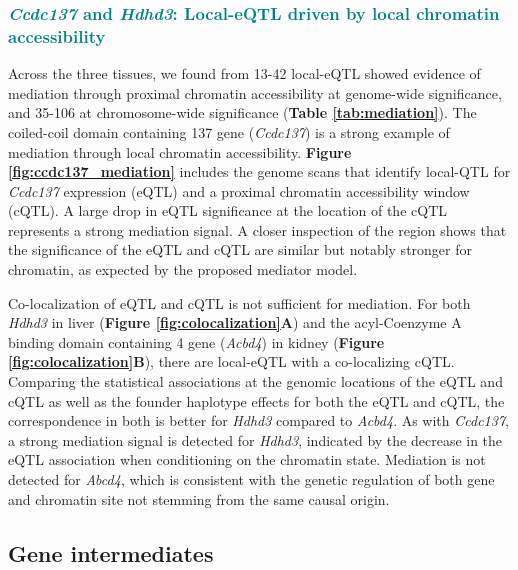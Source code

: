 \documentclass[9pt,twocolumn,twoside]{gsajnl}
\newcommand{\WVinline}[1]{\textcolor{red}{#1}}
\newcommand{\GKinline}[1]{\textcolor{teal}{#1}}
\begin{document}
\subsubsection{\GKinline{\textit{Ccdc137} and \textit{Hdhd3}: Local-eQTL driven by local chromatin accessibility}}
Across the three tissues, we found from 13-42 local-eQTL showed evidence of mediation through proximal chromatin accessibility at genome-wide significance, and 35-106 at chromosome-wide significance (\textbf{Table \ref{tab:mediation}}). The coiled-coil domain containing 137 gene (\textit{Ccdc137}) is a strong example of mediation through local chromatin accessibility. \textbf{Figure \ref{fig:ccdc137_mediation}} includes the genome scans that identify local-QTL for \textit{Ccdc137} expression (eQTL) and a proximal chromatin accessibility window (cQTL). 
A large drop in eQTL significance at the location of the cQTL represents a strong mediation signal. A closer inspection of the region shows that the significance of the eQTL and cQTL are similar but notably stronger for chromatin, as expected by the proposed mediator model. 

Co-localization of eQTL and cQTL is not sufficient for mediation. For both \textit{Hdhd3} in liver (\textbf{Figure \ref{fig:colocalization}A}) and the acyl-Coenzyme A binding domain containing 4 gene (\textit{Acbd4}) in kidney (\textbf{Figure \ref{fig:colocalization}B}), there are local-eQTL with a co-localizing cQTL. Comparing the statistical associations at the genomic locations of the eQTL and cQTL as well as the founder haplotype effects for both the eQTL and cQTL, the correspondence in both is better for \textit{Hdhd3} compared to \textit{Acbd4}. As with \textit{Ccdc137}, a strong mediation signal is detected for \textit{Hdhd3}, indicated by the decrease in the eQTL association when conditioning on the chromatin state. Mediation is not detected for \textit{Abcd4}, which is consistent with the genetic regulation of both gene and chromatin site not stemming from the same causal origin.

\subsection{Gene intermediates} 
\end{document}
